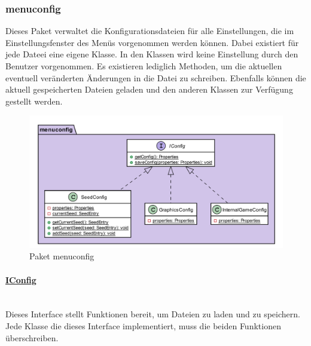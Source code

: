 
\subsubsection{menuconfig}\label{menuconfig}
    Dieses Paket verwaltet die Konfigurationsdateien für alle 
    Einstellungen, die im Einstellungsfenster des Menüs vorgenommen werden können.
    Dabei existiert für jede Dateei eine eigene Klasse. In den Klassen wird
    keine Einstellung durch den Benutzer vorgenommen. Es existieren lediglich
    Methoden, um die aktuellen eventuell veränderten Änderungen in die Datei 
    zu schreiben. Ebenfalls können die aktuell gespeicherten Dateien geladen
    und den anderen Klassen zur Verfügung gestellt werden. \par

    \begin{figure}[!h]
        \centering
        \centering
            \includegraphics[width=\linewidth]{./GUI/GUI_Bilder/Config.png}
              \caption{Paket menuconfig}
               \label{fig:Config}
    \end{figure}

        \paragraph{\underline{IConfig}}\label{configlabel} \mbox{}\\
            Dieses Interface stellt Funktionen bereit, um Dateien zu laden und zu speichern.
            Jede Klasse die dieses Interface implementiert, muss die beiden Funktionen 
            überschreiben.

